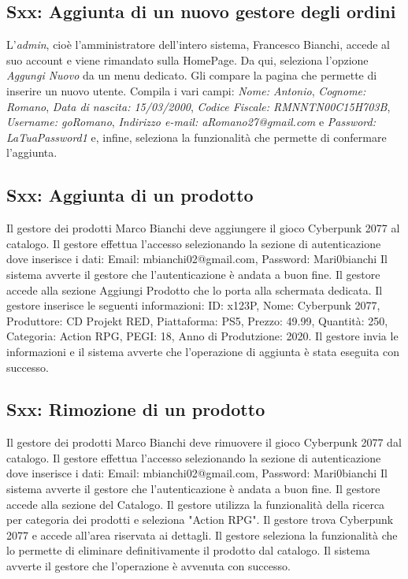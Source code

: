 \documentclass[12pt, a4paper, oneside]{book}
\begin{document}
    \subsection*{Sxx: Aggiunta di un nuovo gestore degli ordini}
    L'\textit{admin}, cioè l'amministratore dell'intero sistema, Francesco Bianchi, accede al suo account e viene rimandato sulla HomePage. Da qui, seleziona l'opzione \textit{Aggungi Nuovo} da un menu dedicato. Gli compare la pagina che permette di inserire un nuovo utente. Compila i vari campi: \textit{Nome: Antonio}, \textit{Cognome: Romano}, \textit{Data di nascita: 15/03/2000}, \textit{Codice Fiscale: RMNNTN00C15H703B}, \textit{Username: goRomano}, \textit{Indirizzo e-mail: aRomano27@gmail.com} e \textit{Password: LaTuaPassword1} e, infine, seleziona la funzionalità che permette di confermare l'aggiunta.

    \subsection*{Sxx: Aggiunta di un prodotto}
    Il gestore dei prodotti Marco Bianchi deve aggiungere il gioco Cyberpunk 2077 al catalogo. Il gestore
    effettua l'accesso selezionando la sezione di autenticazione dove inserisce i dati: Email: mbianchi02@gmail.com, Password: Mari0bianchi
    Il sistema avverte il gestore che l'autenticazione è andata a buon fine. Il gestore accede alla sezione
    Aggiungi Prodotto che lo porta alla schermata dedicata. Il gestore inserisce le seguenti informazioni:
    ID: x123P, Nome: Cyberpunk 2077, Produttore: CD Projekt RED, Piattaforma: PS5, Prezzo: 49.99, Quantità: 250,
    Categoria: Action RPG, PEGI: 18, Anno di Produtzione: 2020. Il gestore invia le informazioni
    e il sistema avverte che l'operazione di aggiunta è stata eseguita con successo.

    \subsection*{Sxx: Rimozione di un prodotto}
    Il gestore dei prodotti Marco Bianchi deve rimuovere il gioco Cyberpunk 2077 dal catalogo.
    Il gestore effettua l'accesso selezionando la sezione di autenticazione dove inserisce i dati: Email: mbianchi02@gmail.com, Password: Mari0bianchi
    Il sistema avverte il gestore che l'autenticazione è andata a buon fine. Il gestore accede alla sezione del Catalogo.
    Il gestore utilizza la funzionalità della ricerca per categoria dei prodotti e seleziona "Action RPG". Il gestore
    trova Cyberpunk 2077 e accede all'area riservata ai dettagli. Il gestore seleziona la funzionalità che lo
    permette di eliminare definitivamente il prodotto dal catalogo. Il sistema avverte il gestore che l'operazione è avvenuta con successo.
\end{document}
